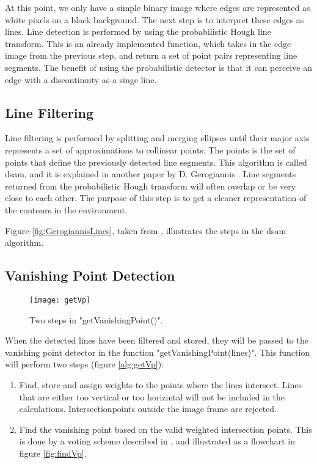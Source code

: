 At this point, we only have a simple binary image where edges are represented as white pixels on a black background. The next step is to interpret these edges as lines. Line detection is performed by using the probabilistic Hough line transform. This is an already implemented function, which takes in the edge image from the previous step, and return a set of point pairs representing line segments. The benefit of using the probabilistic detector is that it can perceive an edge with a discontinuity as a singe line. 

\subsection{Line Filtering}

Line filtering is performed by splitting and merging ellipses until their major axis represents a set of approximations to collinear points. The points is the set of points that define the previously detected line segments. This algorithm is called \gls{dsam}, and it is explained in another paper by D. Gerogiannis \cite{gerogiannisshape}. Line segments returned from the probabilistic Hough transform will often overlap or be very close to each other. The purpose of this step is to get a cleaner representation of the contours in the environment.

Figure \ref{fig:GerogiannisLines}, taken from \cite{gerogiannisvp}, illustrates the steps in the \gls{dsam} algorithm.

\subsection{Vanishing Point Detection}

\begin{wrapfigure}{r}{0.35\textwidth}
	\vspace{-10pt} %
	\centering
	\texttt{[image: getVp]}
	\caption{\label{fig:getVp}Two steps in "getVanishingPoint()".}
	\vspace{-60pt} %
\end{wrapfigure}


When the detected lines have been filtered and stored, they will be passed to the vanishing point detector in the function "getVanishingPoint(lines)". This function will perform two steps (figure \ref{alg:getVp}):

\begin{enumerate}
	\item Find, store and assign weights to the points where the lines intersect. Lines that are either too vertical or too horizintal will not be included in the calculations. Intersectionpoints outside the image frame are rejected.
	\item Find the vanishing point based on the valid weighted intersection points. This is done by a voting scheme described in \cite{gerogiannisvp}, and illustrated as a flowchart in figure \ref{fig:findVp}. 
\end{enumerate}

